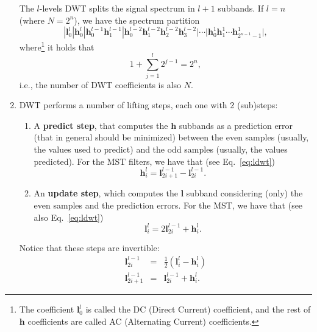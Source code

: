 \begin{enumerate}
  The $l$-levels DWT splits the signal spectrum in $l+1$ subbands. If
  $l=n$ (where $N=2^n$), we have the spectrum partition
  \begin{equation*}
    | {\mathbf l}^l_0 | {\mathbf h}^l_0 | {\mathbf h}^{l-1}_0 {\mathbf h}^{l-1}_1 | {\mathbf h}^{l-2}_0 {\mathbf h}^{l-2}_1 {\mathbf h}^{l-2}_2 {\mathbf h}^{l-2}_3 | \cdots | {\mathbf h}^1_0 {\mathbf h}^1_1 \cdots {\mathbf h}^1_{2^{n-1}-1} |,
  \end{equation*}
  where\footnote{The coefficient ${\mathbf l}^l_0$ is called the DC
    (Direct Current) coefficient, and the rest of ${\mathbf h}$
    coefficients are called AC (Alternating Current) coefficients.} it
  holds that
  \begin{equation}
    1+\sum_{j=1}^l 2^{j-1}=2^n,
  \end{equation}
  i.e., the number of DWT coefficients is also $N$.

\item DWT performs a number of lifting steps, each one with
  2 (sub)steps:
  \begin{enumerate}
  \item A \textbf{predict step}, that computes the ${\mathbf h}$
    subbands as a prediction error (that in general should be
    minimized) between the even samples (usually, the values used to
    predict) and the odd samples (usually, the values predicted). For
    the MST filters, we have that (see Eq.~\eqref{eq:ldwt})
    \begin{equation}
      {\mathbf h}^l_i = {\mathbf l}^{l-1}_{2i+1} - {\mathbf l}^{l-1}_{2i}.
    \end{equation}
    
  \item An \textbf{update step}, which computes the ${\mathbf l}$
    subband considering (only) the even samples and the prediction
    errors. For the MST, we have that (see also Eq.~\eqref{eq:ldwt})
    \begin{equation}
      {\mathbf l}^l_i = 2{\mathbf l}^{l-1}_{2i} + {\mathbf h}^l_i.
    \end{equation}
  \end{enumerate}

  Notice that these steps are invertible:
  \begin{equation}
    \begin{array}{rcl}
      {\mathbf l}^{l-1}_{2i} & = & \frac{1}{2}({\mathbf l}^l_i - {\mathbf h}^l_i)\\
      {\mathbf l}^{l-1}_{2i+1} & = & {\mathbf l}^{l-1}_{2i} + {\mathbf h}^l_i.
    \end{array}
  \end{equation}

\end{enumerate}


